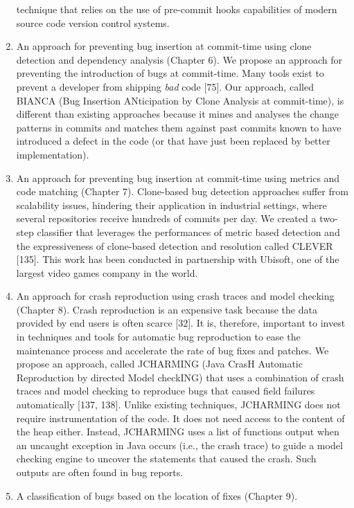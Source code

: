 \documentclass[12pt]{report}
\begin{document}
\begin{enumerate}
  technique that relies on the use of pre-commit hooks capabilities of
  modern source code version control systems.
\item
  An approach for preventing bug insertion at commit-time using clone
  detection and dependency analysis (Chapter 6). We propose an approach
  for preventing the introduction of bugs at commit-time. Many tools
  exist to prevent a developer from shipping \emph{bad} code {[}75{]}.
  Our approach, called BIANCA (Bug Insertion ANticipation by Clone
  Analysis at commit-time), is different than existing approaches
  because it mines and analyses the change patterns in commits and
  matches them against past commits known to have introduced a defect in
  the code (or that have just been replaced by better implementation).
\item
  An approach for preventing bug insertion at commit-time using metrics
  and code matching (Chapter 7). Clone-based bug detection approaches
  suffer from scalability issues, hindering their application in
  industrial settings, where several repositories receive hundreds of
  commits per day. We created a two-step classifier that leverages the
  performances of metric based detection and the expressiveness of
  clone-based detection and resolution called CLEVER {[}135{]}. This
  work has been conducted in partnership with Ubisoft, one of the
  largest video games company in the world.
\item
  An approach for crash reproduction using crash traces and model
  checking (Chapter 8). Crash reproduction is an expensive task because
  the data provided by end users is often scarce {[}32{]}. It is,
  therefore, important to invest in techniques and tools for automatic
  bug reproduction to ease the maintenance process and accelerate the
  rate of bug fixes and patches. We propose an approach, called
  JCHARMING (Java CrasH Automatic Reproduction by directed Model
  checkING) that uses a combination of crash traces and model checking
  to reproduce bugs that caused field failures automatically {[}137,
  138{]}. Unlike existing techniques, JCHARMING does not require
  instrumentation of the code. It does not need access to the content of
  the heap either. Instead, JCHARMING uses a list of functions output
  when an uncaught exception in Java occurs (i.e., the crash trace) to
  guide a model checking engine to uncover the statements that caused
  the crash. Such outputs are often found in bug reports.
\item
  A classification of bugs based on the location of fixes (Chapter 9).

\end{enumerate}
\end{document}
